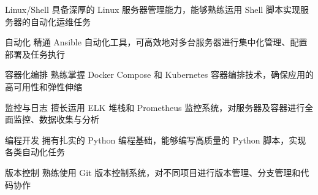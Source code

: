 

\begin{cvskills}

  \cvskill
    {Linux/Shell} %
    {具备深厚的 Linux 服务器管理能力，能够熟练运用 Shell 脚本实现服务器的自动化运维任务} %

  \cvskill
    {自动化} %
    {精通 Ansible 自动化工具，可高效地对多台服务器进行集中化管理、配置部署及任务执行} %

  \cvskill
    {容器化编排} %
    {熟练掌握 Docker Compose 和 Kubernetes 容器编排技术，确保应用的高可用性和弹性伸缩} %

  \cvskill
    {监控与日志} %
    {擅长运用 ELK 堆栈和 Prometheus 监控系统，对服务器及容器进行全面监控、数据收集与分析} %

  \cvskill
    {编程开发} %
    {拥有扎实的 Python 编程基础，能够编写高质量的 Python 脚本，实现各类自动化任务} %

  \cvskill
    {版本控制} %
    {熟练使用 Git 版本控制系统，对不同项目进行版本管理、分支管理和代码协作} %

\end{cvskills}
